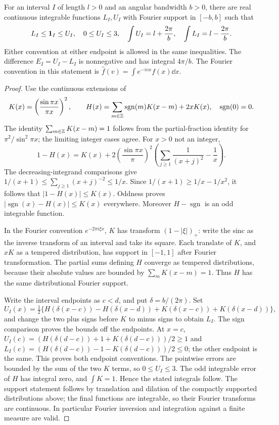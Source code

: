 \begin{lemma}
\label{lem:window-interval-envelopes}
For an interval $I$ of length $l>0$ and an angular bandwidth $b>0$,
there are real continuous integrable functions $L_I,U_I$ with Fourier
support in $[-b,b]$ such that
\begin{equation}\label{eq:interval-envelopes}
 L_I\le\one_I\le U_I,\quad 0\le U_I\le3,\quad
 \int U_I=l+\frac{2\pi}{b},\quad
 \int L_I=l-\frac{2\pi}{b}.
\end{equation}
Either convention at either endpoint is allowed in the same inequalities.
The difference $E_I=U_I-L_I$ is nonnegative and has integral $4\pi/b$.
The Fourier convention in this statement is
$\widehat f(v)=\int e^{-ivx}f(x)\dd x$.
\end{lemma}
\begin{proof}
Use the continuous extensions of
\[
 K(x)=\left(\frac{\sin\pi x}{\pi x}\right)^2,\qquad
 H(x)=\sum_{m\in\mathbb Z}\operatorname{sgn}(m)K(x-m)+2xK(x),
 \quad \operatorname{sgn}(0)=0.
\]
The identity $\sum_{m\in\mathbb Z}K(x-m)=1$ follows from the partial-fraction
identity for $\pi^2/\sin^2\pi x$; the limiting integer cases agree.
For $x>0$ not an integer,
\[
 1-H(x)=K(x)+2\left(\frac{\sin\pi x}{\pi}\right)^2
                  \left(\sum_{j\ge1}\frac1{(x+j)^2}-\frac1x\right).
\]
The decreasing-integrand comparisons give
$1/(x+1)\le\sum_{j\ge1}(x+j)^{-2}\le1/x$.
Since $1/(x+1)\ge1/x-1/x^2$, it follows that
$|1-H(x)|\le K(x)$. Oddness proves
$|\operatorname{sgn}(x)-H(x)|\le K(x)$ everywhere.
Moreover $H-\operatorname{sgn}$ is an odd integrable function.

In the Fourier convention $e^{-2\pi i\xi x}$, $K$ has transform
$(1-|\xi|)_+$: write the sinc as the inverse transform of an interval
and take its square. Each translate of $K$, and $xK$ as a tempered
distribution, has support in $[-1,1]$ after Fourier transformation.
The partial sums defining $H$ converge as tempered distributions,
because their absolute values are bounded by $\sum_m K(x-m)=1$.
Thus $H$ has the same distributional Fourier support.

Write the interval endpoints as $c<d$, and put $\delta=b/(2\pi)$.
Set
\[
 U_I(x)=\tfrac12\{H(\delta(x-c))-H(\delta(x-d))
                       +K(\delta(x-c))+K(\delta(x-d))\},
\]
and change the two plus signs before $K$ to minus signs to obtain $L_I$.
The sign comparison proves the bounds off the endpoints. At $x=c$,
$U_I(c)=(H(\delta(d-c))+1+K(\delta(d-c)))/2\ge1$ and
$L_I(c)=(H(\delta(d-c))-1-K(\delta(d-c)))/2\le0$;
the other endpoint is the same. This proves both endpoint conventions.
The pointwise errors are bounded by the sum of the two $K$ terms,
so $0\le U_I\le3$. The odd integrable error of $H$ has integral
zero, and $\int K=1$. Hence the stated integrals follow. The
support statement follows by translation and dilation of the
compactly supported distributions above; the final functions are
integrable, so their Fourier transforms are continuous. In particular
Fourier inversion and integration against a finite measure are valid.
\end{proof}

